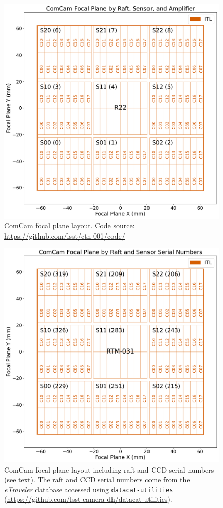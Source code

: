 \documentclass[OPS,authoryear,toc]{lsstdoc}
\begin{document}
\begin{figure}
  \centering
  \includegraphics[width=\textwidth]{figures/ComCam_focal_plane_CTN_001_FIG1.pdf}
  \caption{ComCam focal plane layout. Code source: \url{https://github.com/lsst/ctn-001/code/}}
  \label{fig:comcam_focal_plane_1}
\end{figure}

\clearpage

\begin{figure}
  \centering
  \includegraphics[width=\textwidth]{figures/ComCam_focal_plane_CTN_001_FIG2.pdf}
	\caption{ComCam focal plane layout including raft and CCD serial numbers (see text). The raft and CCD serial numbers come from the \emph{eTraveler} database accessed using {\tt{datacat-utilities}} (\url{https://github.com/lsst-camera-dh/datacat-utilities}).}
  \label{fig:comcam_focal_plane_2}
\end{figure}
\end{document}
